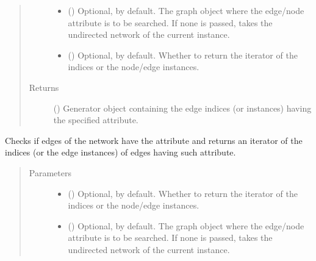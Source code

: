 \documentclass[letterpaper,10pt,english]{sphinxmanual}
\begin{document}
\begin{fulllineitems}
\begin{fulllineitems}
\begin{quote}
\begin{description}
\begin{itemize}
\item {} 
 () \textendash{} Optional,  by default. The graph object where the
edge/node attribute is to be searched. If none is passed,
takes the undirected network of the current instance.

\item {} 
 () \textendash{} Optional,  by default. Whether to return the
iterator of the indices or the node/edge instances.

\end{itemize}

\item[{Returns}] \leavevmode
() \textendash{} Generator object containing the edge
indices (or instances) having the specified attribute.

\end{description}\end{quote}

\end{fulllineitems}


\begin{fulllineitems}
\label{\detokenize{reference:pypath.main.PyPath.having_ptm}}
Checks if edges of the network have the  attribute and
returns an iterator of the indices (or the edge instances) of
edges having such attribute.
\begin{quote}\begin{description}
\item[{Parameters}] \leavevmode\begin{itemize}
\item {} 
 () \textendash{} Optional,  by default. Whether to return the
iterator of the indices or the node/edge instances.

\item {} 
 () \textendash{} Optional,  by default. The graph object where the
edge/node attribute is to be searched. If none is passed,
takes the undirected network of the current instance.


\end{itemize}
\end{description}
\end{quote}
\end{fulllineitems}
\end{fulllineitems}
\end{document}
